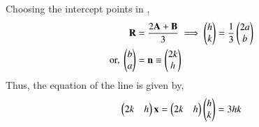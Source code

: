 Choosing the intercept points in ,
\begin{align}
\mathbf{R} &= \frac{2\mathbf{A} + \mathbf{B}}{3} 
\implies
\begin{pmatrix}h\\k\end{pmatrix} = \frac{1}{3}\begin{pmatrix}2a\\b\end{pmatrix} \\
	\text{or, }
\begin{pmatrix}b\\a\end{pmatrix} 
	&= \mathbf{n}  \equiv \begin{pmatrix}2k\\h\end{pmatrix}
\end{align}
%
Thus, the equation of the line is given by,
\begin{align}
\begin{pmatrix}2k&h\end{pmatrix}\mathbf{x} = \begin{pmatrix}2k&h\end{pmatrix}\begin{pmatrix}h\\k\end{pmatrix}= 3hk
\end{align}




